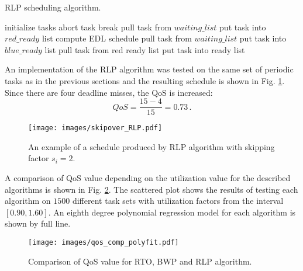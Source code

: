 \begin{algorithm} %
\caption{RLP scheduling algorithm.\label{alg:rlp}}
\begin{algorithmic}[1]
\State initialize tasks
\State abort task
\EndIf
\EndFor
{}
\State break
\EndIf
{}
\State pull task from $waiting\_list$
\State put task into $red\_ready$ list
\Else
{}
\State compute EDL schedule
\EndIf
{}
\State pull task from $waiting\_list$
\State put task into $blue\_ready$ list
\EndIf
\EndIf
\EndFor
{}
\State pull task from red ready list
\State put task into ready list
\EndFor
\EndIf
\end{algorithmic}
\end{algorithm}

An implementation of the RLP algorithm was tested on the same set of periodic tasks as in the previous sections and the resulting schedule is shown in Fig. 
\ref{rlp_schedule}.
Since there are four deadline misses, the QoS is increased:
\begin{equation*}
QoS = \frac{15 - 4}{15} = 0.73 \, .
\end{equation*}
\begin{figure}[ht]
    \centering
    \texttt{[image: images/skipover\_RLP.pdf]}
    \caption{An example of a schedule produced by RLP algorithm with skipping factor $s_i=2$.}
    \label{rlp_schedule}
\end{figure}
A comparison of QoS value depending on the utilization value for the described algorithms is shown in Fig. \ref{fm_comparison}.
The scattered plot shows the results of testing each algorithm on $1500$ different task sets with utilization factors from the interval $[0.90, 1.60]$.
An eighth degree polynomial regression model for each algorithm is shown by full line.
\begin{figure}
    \centering
    \texttt{[image: images/qos\_comp\_polyfit.pdf]}
    \caption{Comparison of QoS value for RTO, BWP and RLP algorithm.}
    \label{fm_comparison}
\end{figure}


